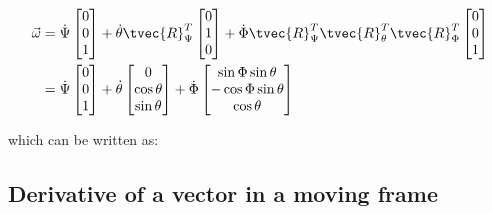 \documentclass[10pt,a4paper]{scrartcl}
\begin{document}
\begin{multicols*}{2}
\begin{align*}
\vec{\omega}&=\dot{\Psi}\begin{bmatrix}
0\\0\\1
\end{bmatrix}+\dot{\theta}\tvec{R}_\Psi^T\begin{bmatrix}
0\\1\\0
\end{bmatrix}+\dot{\Phi}\tvec{R}_\Psi^T\tvec{R}_\theta^T\tvec{R}_\Phi^T\begin{bmatrix}
0\\0\\1
\end{bmatrix}\\
&=\dot{\Psi}\begin{bmatrix}
0\\0\\1
\end{bmatrix}+\dot{\theta}\begin{bmatrix}
0\\\cos\theta\\\sin\theta
\end{bmatrix}+\dot{\Phi}\begin{bmatrix}
\sin\Phi\sin\theta\\
-\cos\Phi\sin\theta\\
\cos\theta
\end{bmatrix}
\end{align*}

which can be written as:


\subsection{Derivative of a vector in a moving frame}



\end{multicols*}
\end{document}
